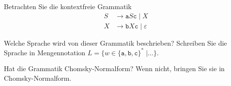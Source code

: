 Betrachten Sie die kontextfreie Grammatik
\begin{align*}
S&\to \texttt{a} S \texttt{c} \mid  X
\\
X&\to \texttt{b}X\texttt{c} \mid  \varepsilon
\end{align*}
\begin{teilaufgaben}
\item
Welche Sprache wird von dieser Grammatik beschrieben?
Schreiben Sie die Sprache in Mengennotation 
$L=\{
w\in\{\texttt{a},\texttt{b},\texttt{c}\}^*
\;|\dots\}$.
\item
Hat die Grammatik Chomsky-Normalform?
Wenn nicht, bringen Sie sie in Chomsky-Normalform.
\end{teilaufgaben}



